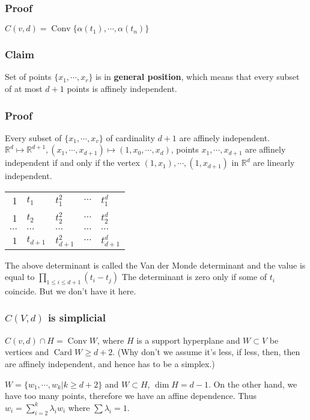 \documentclass[11pt]{article}
\def\R{\mathbb{R}}
\def\conv{\operatorname{Conv}}
\def\card{\operatorname{Card}}
\begin{document}
{{\subsubsection{Proof}
\label{sec:org3db1950}
\(C(v, d) = \conv\{\alpha(t_1), \cdots, \alpha(t_n)\}\)
\subsubsection{Claim}
\label{sec:org56aec3d}
Set of points \(\{x_1, \cdots, x_r\}\) is in \textbf{general position}, which means
that every subset of at most \(d+1\) points is affinely independent.
\subsubsection{Proof}
\label{sec:org52020d5}
Every subset of \(\{x_1, \cdots, x_v\}\) of cardinality \(d+1\) are affinely
independent. \(\R^d \mapsto \R^{d+1}, (x_1, \cdots, x_{d+1}) \mapsto (1, x_0,
    \cdots, x_d)\), points \(x_1, \cdots, x_{d+1}\) are affinely independent if and
only if the vertex \((1, x_1), \cdots, (1, x_{d+1})\) in \(\R^d\) are linearly
independent.

\begin{center}
\begin{tabular}{rllll}
1 & \(t_1\) & \(t_1^2\) & \(\cdots\) & \(t_1^d\)\\
1 & \(t_2\) & \(t_2^2\) & \(\cdots\) & \(t_2^d\)\\
\(\cdots\) & \(\cdots\) & \(\cdots\) & \(\cdots\) & \(\cdots\)\\
\(1\) & \(t_{d+1}\) & \(t_{d+1}^2\) & \(\cdots\) & \(t_{d+1}^{d}\)\\
\end{tabular}
\end{center}

The above determinant is called the Van der Monde determinant and the value
is equal to \(\prod_{1 \le i \le d+1} (t_i - t_j)\) The determinant is zero
only if some of \(t_i\) coincide. But we don't have it here.
\subsubsection{\(C(V, d)\) is simplicial}
\label{sec:org88323ca}
\(C(v, d) \cap H = \conv W\), where \(H\) is a support hyperplane and \(W \subset
    V\) be vertices and \(\card W \ge d+2\). (Why don't we assume it's less, if
less, then, then are affinely independent, and hence has to be a simplex.)

\(W = \{w_1, \cdots, w_k \vert k \ge d+2\}\) and \(W \subset H\), \(\dim H =
    d-1\). On the other hand, we have too many points, therefore we have an
affine dependence. Thus \(w_i = \sum_{i = 2}^{k} \lambda_i w_i\) where
\(\sum \lambda_i =1\).

}}
\end{document}
